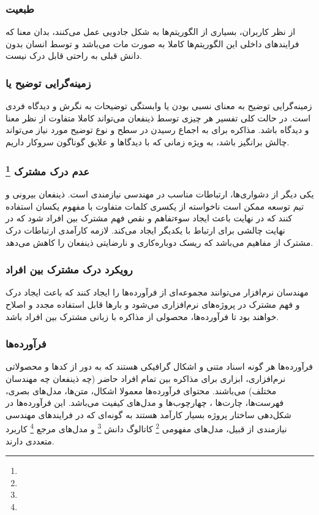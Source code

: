 \subsubsection{طبعیت }

از نظر کاربران، بسیاری از الگوریتم‌ها به شکل جادویی عمل می‌کنند، بدان معنا که
فرایند‌های داخلی این الگوریتم‌ها کاملا به صورت مات می‌باشد و توسط انسان بدون
دانش قبلی به راحتی قابل درک نیست.

\subsubsection{زمینه‌گرایی توضیح یا }

زمینه‌گرایی توضیح به معنای نسبی بودن یا وابستگی توضیحات به نگرش و دیدگاه فردی
است. در حالت کلی تفسیر هر چیزی توسط ذینفعان می‌تواند کاملا متفاوت از نظر معنا و
دیدگاه باشد. مذاکره برای به اجماع رسیدن در سطح و نوع توضیح مورد نیاز می‌تواند
چالش برانگیز باشد، به ویژه زمانی که با دیدگاها و علایق گوناگون سروکار داریم.

\subsubsection*{عدم درک مشترک \footnote{}}

یکی دیگر از دشواری‌ها، ارتباطات مناسب در مهندسی نیازمندی است. ذینفعان بیرونی و
تیم توسعه ممکن است ناخواسته از یکسری کلمات متفاوت با مفهوم یکسان استفاده کنند که
در نهایت باعث ایجاد سوء‌تفاهم و نقص فهم مشترک بین افراد شود که در نهایت چالشی
برای ارتباط با یکدیگر ایجاد می‌کند. لازمه کارآمدی ارتباطات درک مشترک از مفاهیم
می‌باشد که ریسک دوباره‌کاری و نارضایتی ذینفعان را کاهش می‌دهد.

\subsubsection*{رویکرد درک مشترک بین افراد}

مهندسان نرم‌افزار می‌توانند مجموعه‌ای از فرآورده‌ها را ایجاد کنند که باعث ایجاد
درک و فهم مشترک در پروژه‌های نرم‌افزاری می‌شود و بار‌ها قابل استفاده مجدد و
اصلاح خواهند بود تا فرآورده‌ها، محصولی از مذاکره با زبانی مشترک بین افراد باشد.

\subsubsection*{فرآورده‌ها}

فرآورده‌ها هر گونه اسناد متنی و اشکال گرافیکی هستند که به دور از کد‌ها و
محصولاتی نرم‌افزاری، ابزاری برای مذاکره بین تمام افراد‌ حاضر (چه ذینفعان چه
مهندسان مختلف) می‌باشند. محتوای فرآورده‌ها معمولا اشکال، متن‌ها، مدل‌های بصری،
فهرست‌ها، چارت‌ها ، چهارچوب‌ها و مدل‌های کیفیت می‌باشد. این فرآورده‌ها در
شکل‌دهی ساختار پروژه بسیار کارآمد هستند به گونه‌ای که در فرایند‌های مهندسی
نیازمندی از قبیل، مدل‌های مفهومی \footnote{} کاتالوگ دانش
\footnote{} و مدل‌های مرجع \footnote{} کاربرد متعددی دارند.

